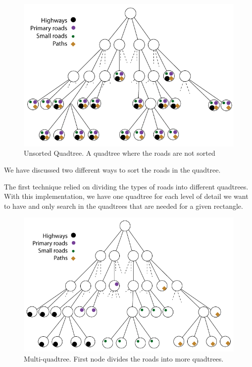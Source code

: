 \begin{figure}[h!]
\centering
\includegraphics[width=1\linewidth]{images/UnsortedQuadtree.png}
\caption{Unsorted Quadtree. A quadtree where the roads are not sorted}
\label{IMPL-USQ}
\end{figure}

We have discussed two different ways to sort the roads in the quadtree. 

The first technique relied on dividing the types of roads into different
quadtrees. With this implementation, we have one quadtree for each level of
detail we want to have and only search in the quadtrees that are needed for a
given rectangle.

\begin{figure}[h!]
\centering
\includegraphics[width=1\linewidth]{images/MultiQuadtree.png}
\caption{Multi-quadtree. First node divides the roads into more
quadtrees.}
\label{IMPL-DCQ}
\end{figure}

